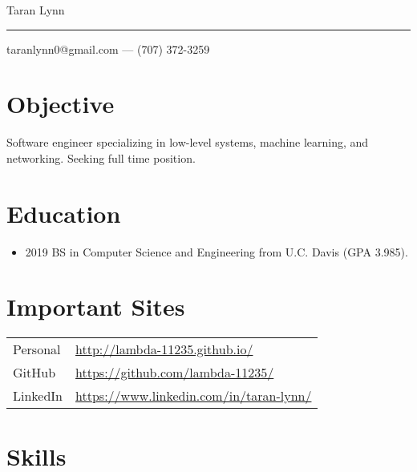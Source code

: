 \documentclass{article}
\begin{document}
\begin{center}
    {\Huge Taran Lynn}\\
    \vspace{0.25em}
    \hrule
    \vspace{0.25em}
    taranlynn0@gmail.com --- (707) 372-3259
\end{center}

\section*{Objective}

Software engineer specializing in low-level systems, machine learning, and
networking.
Seeking full time position.

\section*{Education}

\begin{itemize}
    \item 2019 BS in Computer Science and Engineering from U.C. Davis
        (GPA 3.985).
\end{itemize}

\section*{Important Sites}

\begin{tabular}{ll}
    Personal & \url{http://lambda-11235.github.io/}\\
    GitHub & \url{https://github.com/lambda-11235/}\\
    LinkedIn & \url{https://www.linkedin.com/in/taran-lynn/}\\
\end{tabular}

\section*{Skills}
\end{document}
